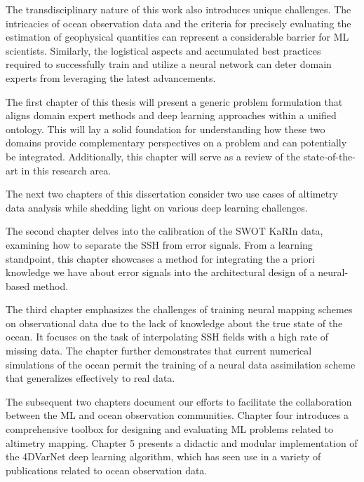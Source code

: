 \begin{bibunit}
The transdisciplinary nature of this work also introduces unique challenges. The intricacies of ocean observation data and the criteria for precisely evaluating the estimation of geophysical quantities can represent a considerable barrier for ML scientists. Similarly, the logistical aspects and accumulated best practices required to successfully train and utilize a neural network can deter domain experts from leveraging the latest advancements.

The first chapter of this thesis will present a generic problem formulation that aligns domain expert methods and deep learning approaches within a unified ontology. This will lay a solid foundation for understanding how these two domains provide complementary perspectives on a problem and can potentially be integrated. Additionally, this chapter will serve as a review of the state-of-the-art in this research area.

The next two chapters of this dissertation consider two use cases of altimetry data analysis while shedding light on various deep learning challenges.

The second chapter delves into the calibration of the SWOT KaRIn data, examining how to separate the SSH from error signals. From a learning standpoint, this chapter showcases a method for integrating the a priori knowledge we have about error signals into the architectural design of a neural-based method.

The third chapter emphasizes the challenges of training neural mapping schemes on observational data due to the lack of knowledge about the true state of the ocean. It focuses on the task of interpolating SSH fields with a high rate of missing data. The chapter further demonstrates that current numerical simulations of the ocean permit the training of a neural data assimilation scheme that generalizes effectively to real data.

The subsequent two chapters document our efforts to facilitate the collaboration between the ML and ocean observation communities. Chapter four introduces a comprehensive toolbox for designing and evaluating ML problems related to altimetry mapping. Chapter 5 presents a didactic and modular implementation of the 4DVarNet deep learning algorithm, which has seen use in a variety of publications related to ocean observation data.


\end{bibunit}

